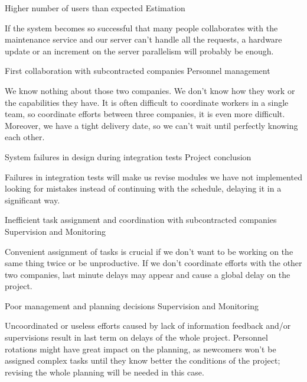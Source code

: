 \begin{risk}[riskUserLoad]{Higher number of users than expected}
\riskcat Estimation

If the system becomes so successful that many people collaborates with the maintenance service and our server can't handle all the requests, a hardware update or an increment on the server parallelism will probably be enough.
\end{risk}

\begin{risk}[riskCollaboration]{First collaboration with subcontracted companies}
\riskcat Personnel management

We know nothing about those two companies. We don't know how they work or the capabilities they have. It is often difficult to coordinate workers in a single team, so coordinate efforts between three companies, it is even more difficult. Moreover, we have a tight delivery date, so we can't wait until perfectly knowing each other.
\end{risk}

\begin{risk}[riskIntegrationTests]{System failures in design during integration tests}
\riskcat Project conclusion

Failures in integration tests will make us revise modules we have not implemented looking for mistakes instead of continuing with the schedule, delaying it in a significant way.
\end{risk}

\begin{risk}[riskAssignment]{Inefficient task assignment and coordination with subcontracted companies}
\riskcat Supervision and Monitoring

Convenient assignment of tasks is crucial if we don't want to be working on the same thing twice or be unproductive. If we don't coordinate efforts with the other two companies, last minute delays may appear and cause a global delay on the project.
\end{risk}

\begin{risk}[riskManagement]{Poor management and planning decisions}
\riskcat Supervision and Monitoring

Uncoordinated or useless efforts caused by lack of information feedback and/or supervisions result in last term on delays of the whole project. Personnel rotations might have great impact on the planning, as newcomers won't be assigned complex tasks until they know better the conditions of the project; revising the whole planning will be needed in this case.
\end{risk}

